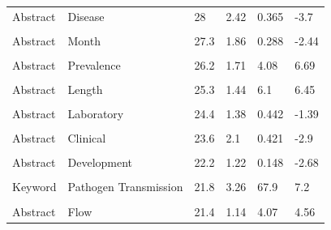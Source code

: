 \documentclass[
]{article}
\begin{document}
\begin{table}[!h]
{\begin{tabular}[t]{llllll}
Abstract & Disease & 28 & 2.42 & 0.365 & -3.7\\
\cellcolor{gray!6}{Keyword} & \cellcolor{gray!6}{Enterococci} & \cellcolor{gray!6}{27.5} & \cellcolor{gray!6}{1.92} & \cellcolor{gray!6}{25.2} & \cellcolor{gray!6}{6.33}\\
\addlinespace
Abstract & Month & 27.3 & 1.86 & 0.288 & -2.44\\
\cellcolor{gray!6}{Abstract} & \cellcolor{gray!6}{Healthcare \& Facility} & \cellcolor{gray!6}{26.2} & \cellcolor{gray!6}{1.74} & \cellcolor{gray!6}{34.9} & \cellcolor{gray!6}{17}\\
Abstract & Prevalence & 26.2 & 1.71 & 4.08 & 6.69\\
\cellcolor{gray!6}{Abstract} & \cellcolor{gray!6}{Effort} & \cellcolor{gray!6}{26.1} & \cellcolor{gray!6}{1.22} & \cellcolor{gray!6}{6.64} & \cellcolor{gray!6}{8.57}\\
Abstract & Length & 25.3 & 1.44 & 6.1 & 6.45\\
\addlinespace
\cellcolor{gray!6}{Keyword} & \cellcolor{gray!6}{System} & \cellcolor{gray!6}{25} & \cellcolor{gray!6}{1.43} & \cellcolor{gray!6}{11.9} & \cellcolor{gray!6}{3.47}\\
Abstract & Laboratory & 24.4 & 1.38 & 0.442 & -1.39\\
\cellcolor{gray!6}{Keyword} & \cellcolor{gray!6}{Resistant Staphylococcus Aureus} & \cellcolor{gray!6}{24.4} & \cellcolor{gray!6}{1.59} & \cellcolor{gray!6}{22.8} & \cellcolor{gray!6}{11.2}\\
Abstract & Clinical & 23.6 & 2.1 & 0.421 & -2.9\\
\cellcolor{gray!6}{Abstract} & \cellcolor{gray!6}{Dataset} & \cellcolor{gray!6}{22.5} & \cellcolor{gray!6}{1.47} & \cellcolor{gray!6}{8.75} & \cellcolor{gray!6}{6.5}\\
\addlinespace
Abstract & Development & 22.2 & 1.22 & 0.148 & -2.68\\
\cellcolor{gray!6}{Abstract} & \cellcolor{gray!6}{Hand} & \cellcolor{gray!6}{22} & \cellcolor{gray!6}{1.97} & \cellcolor{gray!6}{0.822} & \cellcolor{gray!6}{-0.335}\\
Keyword & Pathogen Transmission & 21.8 & 3.26 & 67.9 & 7.2\\
\cellcolor{gray!6}{Keyword} & \cellcolor{gray!6}{Cross Infection \& Humans \& Transmission} & \cellcolor{gray!6}{21.7} & \cellcolor{gray!6}{1.4} & \cellcolor{gray!6}{31.1} & \cellcolor{gray!6}{15.5}\\
Abstract & Flow & 21.4 & 1.14 & 4.07 & 4.56\\
\bottomrule
\end{tabular}}
\end{table}
\end{document}
